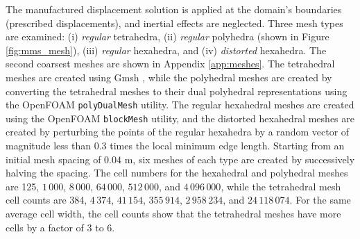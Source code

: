 \documentclass[sn-mathphys,Numbered]{sn-jnl}%
\begin{document}
The manufactured displacement solution is applied at the domain's boundaries (prescribed displacements), and inertial effects are neglected.
Three mesh types are examined:
(i) \emph{regular} tetrahedra, (ii) \emph{regular} polyhedra (shown in Figure \ref{fig:mms_mesh}), (iii) \emph{regular} hexahedra, and (iv) \emph{distorted} hexahedra.
The second coarsest meshes are shown in Appendix \ref{app:meshes}.
The tetrahedral meshes are created using Gmsh \citep{geuzaine2009gmsh}, while the polyhedral meshes are created by converting the tetrahedral meshes to their dual polyhedral representations using the OpenFOAM \texttt{polyDualMesh} utility.
The regular hexahedral meshes are created using the OpenFOAM \texttt{blockMesh} utility, and the distorted hexahedral meshes are created by perturbing the points of the regular hexahedra by a random vector of magnitude less than 0.3 times the local minimum edge length.
Starting from an initial mesh spacing of $0.04$ m, six meshes of each type are created by successively halving the spacing.
The cell numbers for the hexahedral and polyhedral meshes are 125, $1\,000$, $8\,000$, $64\,000$, $512\,000$, and $4\,096\,000$, while the tetrahedral mesh cell counts are 384, $4\,374$, $41\,154$, $355\,914$, $2\,958\,234$, and $24\,118\,074$.
For the same average cell width, the cell counts show that the tetrahedral meshes have more cells by a factor of 3 to 6.
\end{document}
